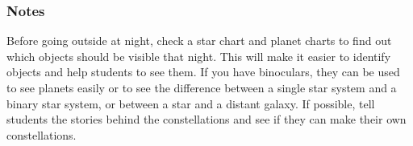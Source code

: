 \subsubsection*{Notes}
Before going outside at night, check a star chart and planet charts to find out which objects should be visible that night. This will make it easier to identify objects and help students to see them. If you have binoculars, they can be used to see planets easily or to see the difference between a single star system and a binary star system, or between a star and a distant galaxy. If possible, tell students the stories behind the constellations and see if they can make their own constellations.





